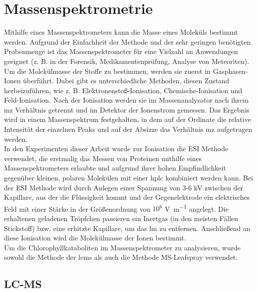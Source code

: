 \section{Massenspektrometrie}

Mithilfe eines Massenspektrometers kann die Masse eines Moleküls bestimmt werden. Aufgrund der Einfachheit der Methode und der sehr geringen benötigten Probenmenge ist das Massenspektrometer für eine Vielzahl an Anwendungen geeignet (z. B. in der Forensik, Medikamentenprüfung, Analyse von Meteoriten). \cite[S. 1]{MassSpectrometry} \\

Um die Molekülmasse der Stoffe zu bestimmen, werden sie zuerst in Gasphasen-Ionen überführt. \cite[S. 15]{MassSpectrometry} Dabei gibt es unterschiedliche Methoden, diesen Zustand herbeizuführen, wie z. B. Elektronenstoß-Ionisation, Chemische-Ionisation und Feld-Ionisation. \cite[S. 15-30]{MassSpectrometry} Nach der Ionisation werden sie im Massenanalysator nach ihrem \gls{mz} Verhältnis getrennt und im Detektor der Ionenstrom gemessen. Das Ergebnis wird in einem Massenspektrum festgehalten, in dem auf der Ordinate die relative Intensität der einzelnen Peaks und auf der Absizze das Verhältnis \gls{mz} aufgetragen werden. \\

In den Experimenten dieser Arbeit wurde zur Ionisation die \gls{ESI} Methode verwendet, die erstmalig das Messen von Proteinen mithilfe eines Massenspektrometers erlaubte und aufgrund ihrer hohen Empfindlichkeit gegenüber kleinen, polaren Molekülen mit einer \gls{hplc} kombiniert werden kann. Bei der \gls{ESI} Methode wird durch Anlegen einer Spannung von 3-6 kV zwischen der Kapillare, aus der die Flüssigkeit kommt und der Gegenelektrode ein elektrisches Feld mit einer Stärke in der Größenordnung von $10^{6}$ \si{\V\per\m} angelegt. Die erhaltenen geladenen Tröpfchen passieren ein Inertgas (in den meisten Fällen Stickstoff) bzw. eine erhitzte Kapillare, um das \gls{lm} zu entfernen. Anschließend an diese Ionisation wird die Molekülmasse der Ionen bestimmt. \cite[S. 43-44]{MassSpectrometry} \\

Um die Chlorophyllkataboliten im Massenspektrometer zu analysieren, wurde sowohl die Methode der \gls{lcms} als auch die Methode MS-Leafspray verwendet. 

\subsection{LC-MS}

